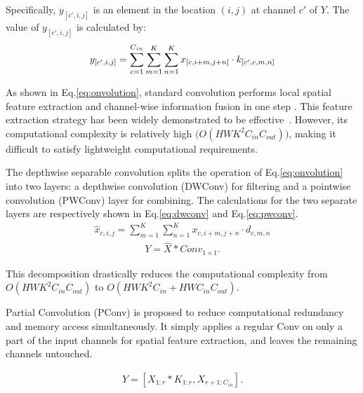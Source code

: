 \documentclass[a4paper,fleqn]{cas-dc}
\begin{document}
Specifically, $y_{[c',i,j]}$ is an element in the location $(i,j)$ at channel $c'$ of $Y$. The value of $y_{[c',i,j]}$ is calculated by:
\begin{equation}
   \centering 
        y_{\left\lbrack c^{\prime},i,j\right\rbrack}=\sum\limits_{c=1}^{C_{_{}in}}\sum\limits_{m=1}^{K}\sum\limits_{n=1}^{K}x_{\left\lbrack c,i+m,j+n\right\rbrack} \cdot k_{\left\lbrack c^{\prime},c,m,n\right\rbrack}
    \label{eq:onvolution}
\end{equation}

As shown in Eq.\ref{eq:onvolution}, standard convolution performs local spatial feature extraction and channel-wise information fusion in one step \cite{howard2017mobilenets}. 
{\color{blue}This feature extraction strategy has been widely demonstrated to be effective~\cite{ren2016faster,redmon2018yolov3}.}
{\color{blue}However, its computational complexity is relatively high $\big(O(HWK^2 C_{in}C_{out})\big)$, making it difficult to satisfy lightweight computational requirements.}


The depthwise separable convolution splits the operation of Eq.\ref{eq:onvolution} into two layers: a depthwise convolution (DWConv) for filtering and a pointwise convolution (PWConv) layer for combining. The calculations for the two separate layers are respectively shown in Eq.\ref{eq:dwconv} and Eq.\ref{eq:pwconv}.
\begin{equation}
\label{eq:dwconv}
\begin{gathered}
    \hat{x}_{c,i,j} = \sum\limits_{m=1}^{K}\sum\limits_{n=1}^{K}x_{c,i+m,j+n}\cdot d_{c,m,n}
\end{gathered}
\end{equation}
\begin{equation}
\label{eq:pwconv}
\begin{gathered}
    Y = \hat{X}*Conv_{1\times1}.
\end{gathered}
\end{equation}

{\color{blue}
This decomposition drastically reduces the computational complexity from
$O(HWK^2C_{in}C_{out})$ to
$O(HWK^2C_{in}+HWC_{in}C_{out})$.
}


{\color{blue}Partial Convolution (PConv)} is proposed to reduce computational redundancy and memory access simultaneously. It simply applies a regular Conv on only a part of the
input channels for spatial feature extraction, and leaves the
remaining channels untouched. 
 
\begin{equation}
\begin{gathered}
    Y = [X_{1:r}*K_{1:r},X_{r+1:C_{in}}].
\end{gathered}
\end{equation}
\end{document}
